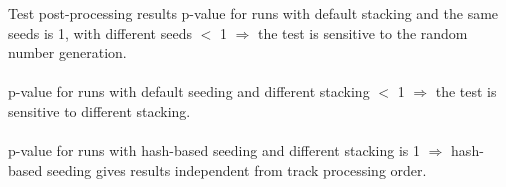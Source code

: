 \documentclass[aspectratio=169, 14pt]{beamer}
\begin{document}
\begin{large}
 \begin{frame}{Test post-processing results}
  p-value for runs with default stacking and the same seeds is 1, with different seeds $<$ 1
  $\Rightarrow$ the test is sensitive to the random number generation.\\\ \\
  p-value for runs with default seeding and different stacking $<$ 1
  $\Rightarrow$ the test is sensitive to different stacking.\\\ \\
  p-value for runs with hash-based seeding and different stacking is 1
  $\Rightarrow$ hash-based seeding gives results independent from track processing order.
 \end{frame}
 
 
 \end{large}
\end{document}
